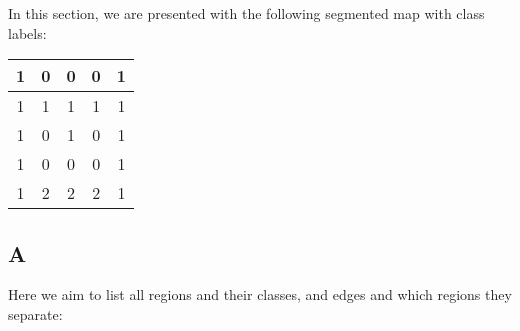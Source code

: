 \documentclass{article}
\begin{document}
In this section, we are presented with the following segmented map with class labels:

\begin{center}
    \begin{tabular}{ | c | c | c | c | c | }
        \hline
        1 & 0 & 0 & 0 & 1 \\ 
        \hline
        1 & 1 & 1 & 1 & 1 \\ 
        \hline
        1 & 0 & 1 & 0 & 1 \\ 
        \hline
        1 & 0 & 0 & 0 & 1 \\ 
        \hline
        1 & 2 & 2 & 2 & 1 \\ 
        \hline  
    \end{tabular}
\end{center}

\subsection*{A}

Here we aim to list all regions and their classes, and edges and which regions they separate:
\end{document}
